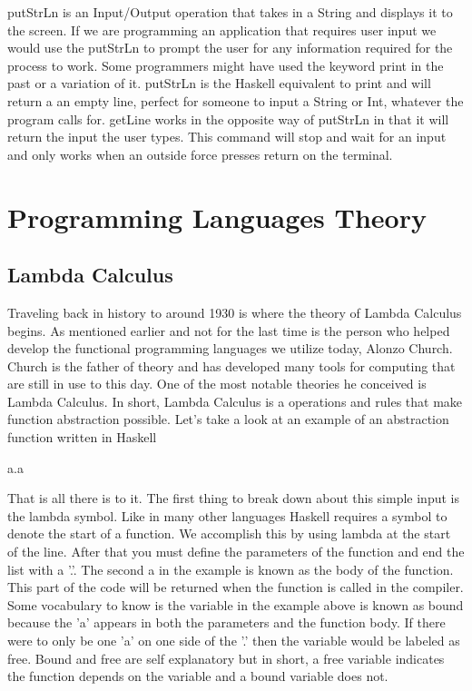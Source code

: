 \documentclass{article}
\begin{document}
    putStrLn is an Input/Output operation that takes in a String and displays it to the screen. If we are programming an application that requires user input we would use the putStrLn to prompt the user for any information required for the process to work. Some programmers might have used the keyword print in the past or a variation of it. putStrLn is the Haskell equivalent to print and will return a an empty line, perfect for someone to input a String or Int, whatever the program calls for. getLine works in the opposite way of putStrLn in that it will return the input the user types. This command will stop and wait for an input and only works when an outside force presses return on the terminal.

\section{Programming Languages Theory}
    \subsection{Lambda Calculus}
    Traveling back in history to around 1930 is where the theory of Lambda Calculus begins. As mentioned earlier and not for the last time is the person who helped develop the functional programming languages we utilize today, Alonzo Church. Church is the father of theory and has developed many tools for computing that are still in use to this day. One of the most notable theories he conceived is Lambda Calculus. In short, Lambda Calculus is a operations and rules that make function abstraction possible. Let's take a look at an example of an abstraction function written in Haskell
    
    \medskip
              \lambda a.a
    \medskip
    
    \noindent That is all there is to it. The first thing to break down about this simple input is the lambda symbol. Like in many other languages Haskell requires a symbol to denote the start of a function. We accomplish this by using lambda at the start of the line. After that you must define the parameters of the function and end the list with a '.'. The second a in the example is known as the body of the function. This part of the code will be returned when the function is called in the compiler. Some vocabulary to know is the variable in the example above is known as bound because the 'a' appears in both the parameters and the function body. If there were to only be one 'a' on one side of the '.' then the variable would be labeled as free. Bound and free are self explanatory but in short, a free variable indicates the function depends on the variable and a bound variable does not. 
    
\end{document}
